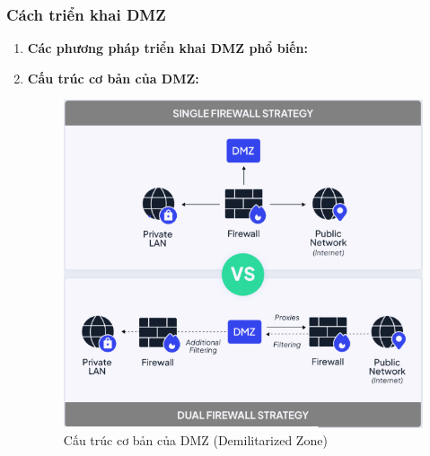\documentclass[13pt]{article}
\begin{document}
\subsubsection{Cách triển khai DMZ}
\begin{enumerate}    
    \begin{itemize}
        \item \textbf{Thiết bị bảo mật:}
        \begin{itemize}
            \item Tường lửa (Firewall): Quản lý lưu lượng giữa mạng nội bộ, DMZ, và Internet.
            \item Bộ cân bằng tải (Load Balancer): Phân phối lưu lượng đến các máy chủ trong DMZ.
        \end{itemize}
        \item \textbf{Tài nguyên trong DMZ:}
        \begin{itemize}
            \item Máy chủ web (Web Server): Cung cấp dịch vụ trực tuyến như website hoặc API.
            \item Máy chủ DNS (Domain Name System): Giải quyết tên miền và cung cấp thông tin DNS cho người dùng bên ngoài.
            \item Máy chủ email (Mail Server): Xử lý email gửi và nhận từ bên ngoài.
            \item VPN Gateway: Cho phép kết nối từ xa an toàn vào mạng nội bộ qua DMZ.
        \end{itemize}
    \end{itemize}
    \item \textbf{Các phương pháp triển khai DMZ phổ biến:}
    \item \textbf{Cấu trúc cơ bản của DMZ:}
    \begin{figure}[h!]
        \centering
        \includegraphics[width=0.7\linewidth]{image/19.png}
            \caption{Cấu trúc cơ bản của DMZ (Demilitarized Zone)}
            \label{fig:label1}
    \end{figure}
    

\end{enumerate}
\end{document}

